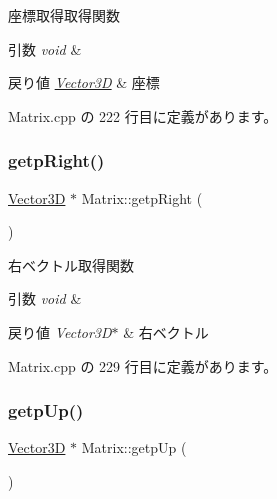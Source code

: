 座標取得取得関数 


\begin{DoxyParams}{引数}
{\em void} & \\
\hline
\end{DoxyParams}

\begin{DoxyRetVals}{戻り値}
{\em \mbox{\hyperlink{class_vector3_d}{Vector3D}}} & 座標 \\
\hline
\end{DoxyRetVals}


 Matrix.\+cpp の 222 行目に定義があります。

\mbox{\label{class_matrix_a8872d3d34f938dd920cfd2e81a33c9cb}} 
\subsubsection{\texorpdfstring{getp\+Right()}{getpRight()}}
{\footnotesize\ttfamily \mbox{\hyperlink{class_vector3_d}{Vector3D}} $\ast$ Matrix\+::getp\+Right (\begin{DoxyParamCaption}{ }\end{DoxyParamCaption})}



右ベクトル取得関数 


\begin{DoxyParams}{引数}
{\em void} & \\
\hline
\end{DoxyParams}

\begin{DoxyRetVals}{戻り値}
{\em Vector3\+D$\ast$} & 右ベクトル \\
\hline
\end{DoxyRetVals}


 Matrix.\+cpp の 229 行目に定義があります。

\mbox{\label{class_matrix_aed95f652a1365e3bb908c2ea07ed7884}} 
\subsubsection{\texorpdfstring{getp\+Up()}{getpUp()}}
{\footnotesize\ttfamily \mbox{\hyperlink{class_vector3_d}{Vector3D}} $\ast$ Matrix\+::getp\+Up (\begin{DoxyParamCaption}{ }\end{DoxyParamCaption})}



